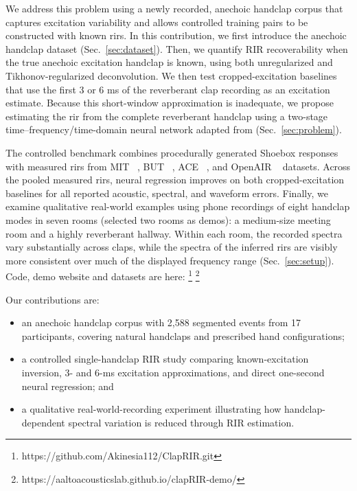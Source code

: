 \documentclass{article}
\begin{document}
We address this problem using a newly recorded, anechoic handclap corpus that captures excitation variability and allows controlled training pairs to be constructed with known \acp{rir}.
In this contribution, we first introduce the anechoic handclap dataset (Sec.~\ref{sec:dataset}). Then, we quantify RIR recoverability when the true anechoic excitation handclap is known, using both unregularized and Tikhonov-regularized deconvolution.
We then test cropped-excitation baselines that use the first 3 or 6 ms of the
reverberant clap recording as an excitation estimate. Because this short-window approximation is inadequate, we propose estimating the \ac{rir} from the complete reverberant handclap using a two-stage time--frequency/time-domain neural network adapted from
\cite{moliner2026ambisonics} (Sec.~\ref{sec:problem}).




The controlled benchmark combines procedurally generated Shoebox responses with measured \acp{rir} from MIT ~\cite{mit}, BUT ~\cite{but}, ACE ~\cite{ace}, and OpenAIR ~\cite{OpenAIR} datasets. 
Across the pooled measured \acp{rir}, neural regression improves on both
cropped-excitation baselines for all reported acoustic, spectral, and waveform
errors. Finally, we examine qualitative real-world examples using phone recordings of eight handclap modes in seven rooms (selected two rooms as demos): a medium-size
meeting room and a highly reverberant hallway.
Within each room, the recorded spectra vary substantially across claps,
while the spectra of the inferred \acp{rir} are visibly more consistent
over much of the displayed frequency range (Sec.~\ref{sec:setup}). Code, demo website and datasets are here: \footnote{https://github.com/Akinesia112/ClapRIR.git}
\footnote{https://aaltoacousticslab.github.io/clapRIR-demo/}

Our contributions are:
\begin{itemize}
    \item an anechoic handclap corpus with 2,588 segmented events from 17 participants, covering natural handclaps and prescribed hand configurations;
    \item a controlled single-handclap RIR study comparing known-excitation
    inversion, 3- and 6-ms excitation approximations, and direct one-second neural regression; and    
    \item a qualitative real-world-recording experiment illustrating how
    handclap-dependent spectral variation is reduced through RIR estimation.
\end{itemize}
\end{document}
